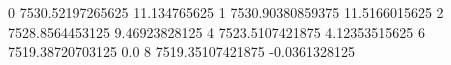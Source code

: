 0 7530.52197265625 11.134765625
1 7530.90380859375 11.5166015625
2 7528.8564453125 9.46923828125
4 7523.5107421875 4.12353515625
6 7519.38720703125 0.0
8 7519.35107421875 -0.0361328125
